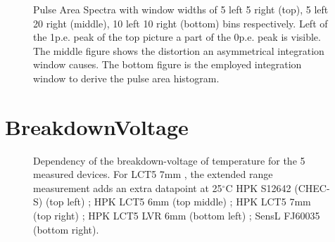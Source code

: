 \documentclass[12pt,article,type=msc,colorback,accentcolor=tud9c]{tudthesis}
\begin{document}
\begin{figure}[h]
\centering
\label{app:PAS_window}
\end{figure}

\begin{figure}[h]
\ContinuedFloat
\begin{centering}
\caption[Pulse area spectra of three different integration windows]{Pulse Area Spectra with window widths of 5 left 5 right (top), 5 left 20 right (middle), 10 left 10 right (bottom) bins respectively. Left of the 1p.e. peak of the top picture a part of the 0p.e. peak is visible. The middle figure shows the distortion an asymmetrical integration window causes. The bottom figure is the employed integration window to derive the pulse area histogram.}
\label{app:PAS_window}
\end{centering}
\end{figure}





\clearpage
\section{BreakdownVoltage}
\label{appsec:Device_Vbr}
\begin{figure}[h]
\begin{centering}
\caption[Breakdown-voltage versus temperature]{Dependency of the breakdown-voltage of temperature for the 5 measured devices. For LCT5 7mm , the extended range measurement adds an extra datapoint at 25$^\circ$C HPK S12642 (CHEC-S) (top left) ; HPK LCT5 6mm (top middle) ; HPK LCT5 7mm (top right) ; HPK LCT5 LVR 6mm (bottom left) ; SensL FJ60035 (bottom right).}
\label{app:Device_Vbr}
\end{centering}
\end{figure}
\end{document}
